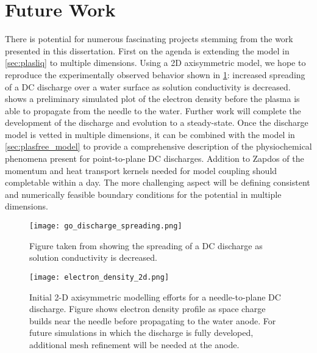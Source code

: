 \section{Future Work}

There is potential for numerous fascinating projects stemming from the work presented in this dissertation. First on the agenda is extending the model in \cref{sec:plasliq} to multiple dimensions. Using a 2D axisymmetric model, we hope to reproduce the experimentally observed behavior shown in \cref{fig:go_spreading}: increased spreading of a DC discharge over a water surface as solution conductivity is decreased.  shows a preliminary simulated plot of the electron density before the plasma is able to propagate from the needle to the water. Further work will complete the development of the discharge and evolution to a steady-state. Once the discharge model is vetted in multiple dimensions, it can be combined with the model in \cref{sec:plasfree_model} to provide a comprehensive description of the physiochemical phenomena present for point-to-plane DC discharges. Addition to Zapdos of the momentum and heat transport kernels needed for model coupling should completable within a day. The more challenging aspect will be defining consistent and numerically feasible boundary conditions for the potential in multiple dimensions.

\begin{figure}[htbp]
  \centering
  \texttt{[image: go\_discharge\_spreading.png]}
  \caption{Figure taken from \cite{rumbach2015solvation} showing the spreading of a DC discharge as solution conductivity is decreased.}
  \label{fig:go_spreading}
\end{figure}

\begin{figure}[htbp]
  \centering
  \texttt{[image: electron\_density\_2d.png]}
  \caption{Initial 2-D axisymmetric modelling efforts for a needle-to-plane DC discharge. Figure shows electron density profile as space charge builds near the needle before propagating to the water anode. For future simulations in which the discharge is fully developed, additional mesh refinement will be needed at the anode.}
  \label{fig:2d_init}
\end{figure}

